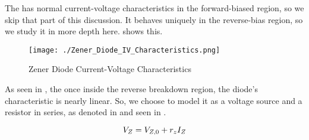 The  has normal current-voltage characteristics in the forward-biased region, so we skip that part of this discussion.
It behaves uniquely in the reverse-bias region, so we study it in more depth here.
 shows this.

\begin{figure}[h!tbp]
  \centering
  \texttt{[image: ./Zener\_Diode\_IV\_Characteristics.png]}
  \caption{Zener Diode Current-Voltage Characteristics \parencite[p.~203]{sedraTextbook7}}
  \label{fig:Zener_Diode_IV_Characteristics}
\end{figure}

As seen in , the once inside the reverse breakdown region, the diode's characteristic is nearly linear.
So, we choose to model it as a voltage source and a resistor in series, as denoted in  and seen in .

\begin{equation}\label{eq:Zener_Diode_Model}
  V_{Z} = V_{Z,0} + r_{z} I_{Z}
\end{equation}



